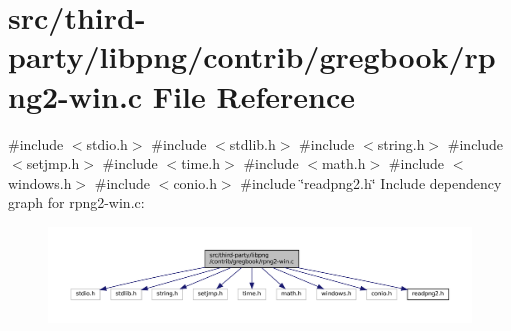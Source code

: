 \hypertarget{rpng2-win_8c}{}\section{src/third-\/party/libpng/contrib/gregbook/rpng2-\/win.c File Reference}
\label{rpng2-win_8c}
{\ttfamily \#include $<$stdio.\+h$>$}\newline
{\ttfamily \#include $<$stdlib.\+h$>$}\newline
{\ttfamily \#include $<$string.\+h$>$}\newline
{\ttfamily \#include $<$setjmp.\+h$>$}\newline
{\ttfamily \#include $<$time.\+h$>$}\newline
{\ttfamily \#include $<$math.\+h$>$}\newline
{\ttfamily \#include $<$windows.\+h$>$}\newline
{\ttfamily \#include $<$conio.\+h$>$}\newline
{\ttfamily \#include \char`\"{}readpng2.\+h\char`\"{}}\newline
Include dependency graph for rpng2-\/win.c\+:
\nopagebreak
\begin{figure}[H]
\begin{center}
\leavevmode
\includegraphics[width=350pt]{rpng2-win_8c__incl}
\end{center}
\end{figure}
